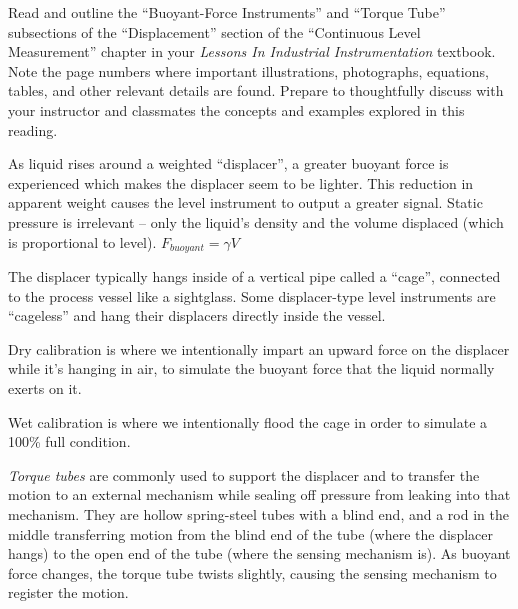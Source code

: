 

Read and outline the ``Buoyant-Force Instruments'' and ``Torque Tube'' subsections of the ``Displacement'' section of the ``Continuous Level Measurement'' chapter in your {\it Lessons In Industrial Instrumentation} textbook.  Note the page numbers where important illustrations, photographs, equations, tables, and other relevant details are found.  Prepare to thoughtfully discuss with your instructor and classmates the concepts and examples explored in this reading.














As liquid rises around a weighted ``displacer'', a greater buoyant force is experienced which makes the displacer seem to be lighter.  This reduction in apparent weight causes the level instrument to output a greater signal.  Static pressure is irrelevant -- only the liquid's density and the volume displaced (which is proportional to level).  $F_{buoyant} = \gamma V$

\vskip 10pt

The displacer typically hangs inside of a vertical pipe called a ``cage'', connected to the process vessel like a sightglass.  Some displacer-type level instruments are ``cageless'' and hang their displacers directly inside the vessel.

\vskip 10pt

Dry calibration is where we intentionally impart an upward force on the displacer while it's hanging in air, to simulate the buoyant force that the liquid normally exerts on it.

\vskip 10pt

Wet calibration is where we intentionally flood the cage in order to simulate a 100\% full condition.

\vskip 10pt

{\it Torque tubes} are commonly used to support the displacer and to transfer the motion to an external mechanism while sealing off pressure from leaking into that mechanism.  They are hollow spring-steel tubes with a blind end, and a rod in the middle transferring motion from the blind end of the tube (where the displacer hangs) to the open end of the tube (where the sensing mechanism is).  As buoyant force changes, the torque tube twists slightly, causing the sensing mechanism to register the motion.





